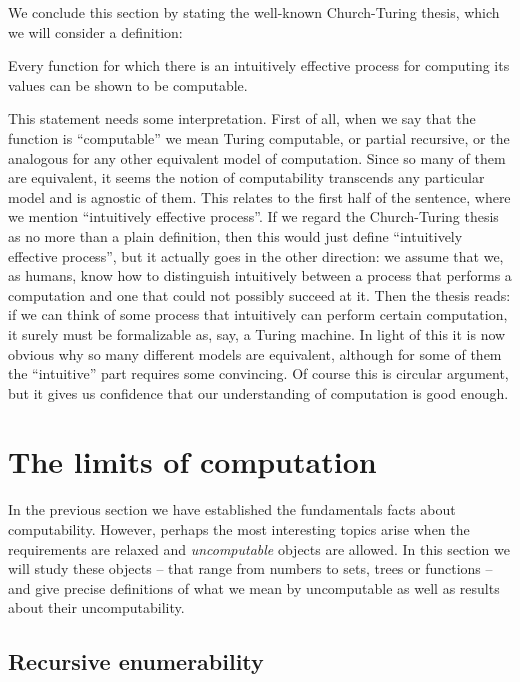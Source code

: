 \documentclass[../main.tex]{memoir}
\begin{document}
We conclude this section by stating the well-known Church-Turing thesis, which we will consider a definition:

\begin{definition}
  Every function for which there is an intuitively effective process for computing its values can be shown to be computable.
\end{definition}

This statement needs some interpretation. First of all, when we say that the function is ``computable'' we mean Turing computable, or partial recursive, or the analogous for any other equivalent model of computation. Since so many of them are equivalent, it seems the notion of computability transcends any particular model and is agnostic of them. This relates to the first half of the sentence, where we mention ``intuitively effective process''. If we regard the Church-Turing thesis as no more than a plain definition, then this would just define ``intuitively effective process'', but it actually goes in the other direction: we assume that we, as humans, know how to distinguish intuitively between a process that performs a computation and one that could not possibly succeed at it. Then the thesis reads: if we can think of some process that intuitively can perform certain computation, it surely must be formalizable as, say, a Turing machine. In light of this it is now obvious why so many different models are equivalent, although for some of them the ``intuitive'' part requires some convincing. Of course this is circular argument, but it gives us confidence that our understanding of computation is good enough.

\section{The limits of computation}

In the previous section we have established the fundamentals facts about computability. However, perhaps the most interesting topics arise when the requirements are relaxed and \textit{uncomputable} objects are allowed. In this section we will study these objects -- that range from numbers to sets, trees or functions -- and give precise definitions of what we mean by uncomputable as well as results about their uncomputability.

\subsection{Recursive enumerability}
\end{document}
